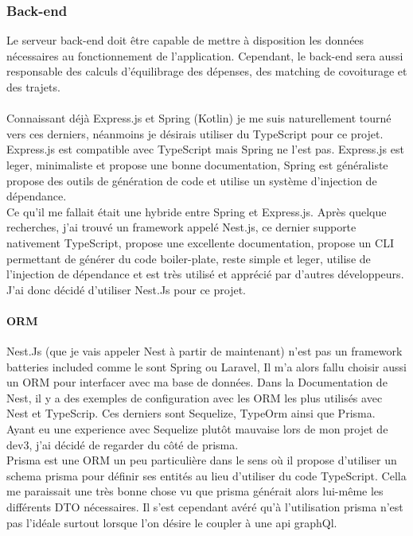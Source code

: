 \subsubsection{Back-end}\label{subsubsec:back-end}
Le serveur back-end doit être capable de mettre à disposition les données nécessaires au fonctionnement de l'application.
Cependant, le back-end sera aussi responsable des calculs d'équilibrage des dépenses, des matching de covoiturage et des trajets.\\\\

Connaissant déjà Express.js et Spring (Kotlin) je me suis naturellement tourné vers ces derniers, néanmoins je désirais utiliser du TypeScript pour ce projet.
Express.js est compatible avec TypeScript mais Spring ne l'est pas.
Express.js est leger, minimaliste et propose une bonne documentation,
Spring est généraliste propose des outils de génération de code et utilise un système d'injection de dépendance.\\

Ce qu'il me fallait était une hybride entre Spring et Express.js.
Après quelque recherches, j'ai trouvé un framework appelé Nest.js, ce dernier supporte nativement TypeScript, propose une excellente documentation,
propose un CLI permettant de générer du code boiler-plate, reste simple et leger, utilise de l'injection de dépendance et est très utilisé et apprécié par d'autres développeurs.
J'ai donc décidé d'utiliser Nest.Js pour ce projet.

\paragraph{ORM}
Nest.Js (que je vais appeler Nest à partir de maintenant) n'est pas un framework batteries included comme le sont Spring ou Laravel,
Il m'a alors fallu choisir aussi un ORM pour interfacer avec ma base de données.
Dans la Documentation de Nest, il y a des exemples de configuration avec les ORM les plus utilisés avec Nest et TypeScrip.
Ces derniers sont Sequelize, TypeOrm ainsi que Prisma.
Ayant eu une experience avec Sequelize plutôt mauvaise lors de mon projet de dev3, j'ai décidé de regarder du côté de prisma.\\

Prisma est une ORM un peu particulière dans le sens où il propose d'utiliser un schema prisma pour définir ses entités au lieu d'utiliser du code TypeScript.
Cella me paraissait une très bonne chose vu que prisma générait alors lui-même les différents DTO nécessaires.
Il s'est cependant avéré qu'à l'utilisation prisma n'est pas l'idéale surtout lorsque l'on désire le coupler à une \Gls{api} graphQl.\\


